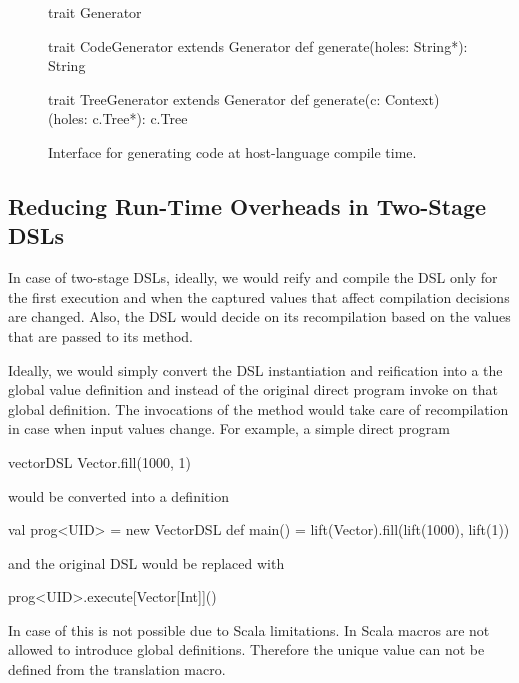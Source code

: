 \begin{figure}
\begin{listingtiny}
trait Generator

trait CodeGenerator extends Generator {
  def generate(holes: String*): String
}

trait TreeGenerator extends Generator {
  def generate(c: Context)(holes: c.Tree*): c.Tree
}
\end{listingtiny}
\caption{Interface for generating code at host-language compile time.}
  \label{fig:generator-traits}
\end{figure}


\subsection{Reducing Run-Time Overheads in Two-Stage DSLs}
\label{sec:worfklow-for-reducing-run-time-overheads-in-multi-stage}

In case of two-stage DSLs, ideally, we would reify and compile the DSL only
for the first execution and when the captured values that affect compilation
decisions are changed. Also, the DSL would decide on its recompilation based on
the values that are passed to its  method.

Ideally, we would simply convert the DSL instantiation and reification into a the global value definition and
instead of the original direct program invoke  on that global definition. The
invocations of the  method would take care of recompilation in case when
input values change. For example, a simple direct program\begin{lstparagraph}
vectorDSL { Vector.fill(1000, 1) }
\end{lstparagraph} would be converted into a definition\begin{lstparagraph}
val prog<UID> = new VectorDSL {
  def main() = lift(Vector).fill(lift(1000), lift(1))
}
\end{lstparagraph}
and the original DSL would be replaced with\begin{lstparagraph}
prog<UID>.execute[Vector[Int]]()
\end{lstparagraph}


In case of \yy this is not possible due to Scala limitations. In Scala macros are
not allowed to introduce global definitions. Therefore the unique value  can
not be defined from the translation macro.

